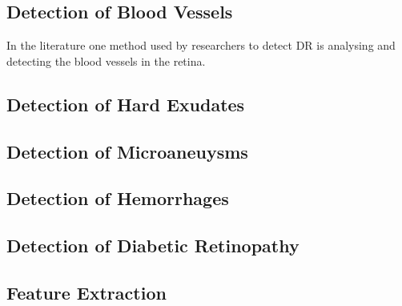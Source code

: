 \subsection{Detection of Blood Vessels}
In the literature one method used by researchers to detect DR is analysing and detecting the blood vessels in the retina. 
\subsection{Detection of Hard Exudates}
\subsection{Detection of Microaneuysms}
\subsection{Detection of Hemorrhages}
\subsection{Detection of Diabetic Retinopathy}
\subsection{Feature Extraction}
